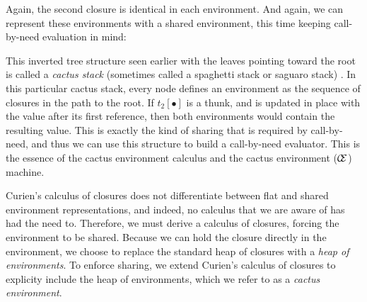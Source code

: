 Again, the second closure is identical in each environment.  And again,
we can represent these environments with a shared environment, this time
keeping call-by-need evaluation in mind:
\begin{center}
\end{center}
This inverted tree structure seen earlier with the leaves pointing toward the
root is called a \emph{cactus stack} (sometimes called a spaghetti stack or
saguaro stack) \cite{hauck1968burroughs,ichbiah1991rationale}. In this
particular cactus stack, every node defines an environment as the sequence of
closures in the path to the root.  If $t_2[\bullet]$ is a thunk, and is updated
in place with the value after its first reference, then both environments would
contain the resulting value. This is exactly the kind of sharing that is
required by call-by-need, and thus we can use this structure to build a
call-by-need evaluator. This is the essence of the cactus environment calculus
and the cactus environment ($\mathcal{\mathcal{C} \mskip -4mu \mathcal{E}}$) machine. 

Curien's calculus of closures does not differentiate between flat and shared
environment representations, and indeed, no calculus that we are aware of has
had the need to. Therefore, we must derive a calculus of closures, forcing the
environment to be shared. Because we can hold the closure directly in the
environment, we choose to replace the standard heap of closures with a
\emph{heap of environments}. To enforce sharing, we extend Curien's
calculus of closures to explicity include the heap of environments, which we
refer to as a \emph{cactus environment}. 


